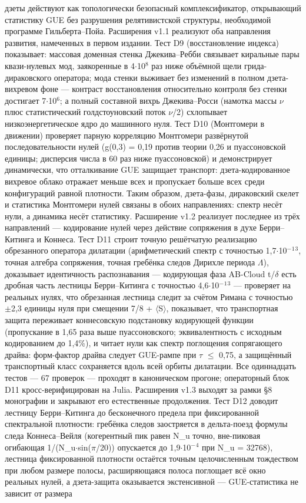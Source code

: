 \documentclass[11pt,a4paper]{article}
\begin{document}
\begin{tcolorbox}[breakable, colback=labblue!6, colframe=labblue!70!black, boxrule=0.6pt, title={Abstract / Аннотация}]
дзеты действуют как топологически безопасный комплексификатор, открывающий статистику GUE без разрушения релятивистской структуры, необходимой программе Гильберта--Пойа. Расширения v1.1 реализуют оба направления развития, намеченных в первом издании. Тест D9 (восстановление индекса) показывает: массовая доменная стенка Джекива--Ребби связывает киральные пары квази-нулевых мод, заякоренные в 4$\cdot$10$^{8}$ раз ниже объёмной щели грида-дираковского оператора; мода стенки выживает без изменений в полном дзета-вихревом фоне --- контраст восстановления относительно контроля без стенки достигает 7$\cdot$10$^{6}$; а полный составной вихрь Джекива--Росси (намотка массы $\nu$ плюс статистический голдстоуновский поток $\nu$/2) схлопывает низкоэнергетическое ядро до машинного нуля. Тест D10 (Монтгомери в движении) проверяет парную корреляцию Монтгомери развёрнутой последовательности нулей (g(0,3) = 0,19 против теории 0,26 и пуассоновской единицы; дисперсия числа в 60 раз ниже пуассоновской) и демонстрирует динамически, что отталкивание GUE защищает транспорт: дзета-кодированное вихревое облако отражает меньше всех и пропускает больше всех среди конфигураций равной плотности. Таким образом, дзета-фазы, дираковский скелет и статистика Монтгомери нулей связаны в обоих направлениях: спектр несёт нули, а динамика несёт статистику. Расширение v1.2 реализует последнее из трёх направлений --- кодирование нулей через действие сопряжения в духе Берри--Китинга и Коннеса. Тест D11 строит точную решётчатую реализацию обрезанного оператора дилатации (арифметический спектр с точностью 1,7$\cdot$10$^{-}$$^{1}$$^{3}$, точная алгебра сопряжения, точная гребёнка следов Дирихле периода $\Lambda$), доказывает идентичность распознавания --- кодирующая фаза AB-Cloud t/$\delta$ есть дробная часть лестницы Берри--Китинга с точностью 4,6$\cdot$10$^{-}$$^{1}$$^{3}$ --- проверяет на реальных нулях, что обрезанная лестница следит за счётом Римана с точностью $\pm$2,3 единицы нуля при смещении 7/8 + $\langle$S$\rangle$, показывает, что транспортная защита переживает коннесовскую подстановку кодирующей функции (пропускание в 1,65 раза выше пуассоновского; эквивалентность с исходным кодированием до 1,4\%), и читает нули как спектр поглощения сопрягающего драйва: форм-фактор драйва следует GUE-рампе при $\tau$ $\le$ 0,75, а защищённый транспортный класс сохраняется вдоль всей орбиты дилатации. Все одиннадцать тестов --- 67 проверок --- проходят в каноническом прогоне; операторный блок D11 кросс-верифицирован на Julia. Расширения v1.3 выходят за рамки \S{}8 монографии и закрывают его естественные продолжения. Тест D12 доводит лестницу Берри--Китинга до бесконечного предела при фиксированной спектральной плотности: гребёнка следов заостряется в дельта-поезд формулы следа Коннеса--Вейля (когерентный пик равен N\_\allowbreak{}u точно, вне-пиковая огибающая 1/(N\_\allowbreak{}u$\cdot$sin($\pi$/20)) опускается до 1,9$\cdot$10$^{-}$$^{4}$ при N\_\allowbreak{}u = 32768), лестница фиксированной плотности остаётся точным целочисленным тождеством при любом размере полосы, расширяющаяся полоса поглощает всё окно реальных нулей, а дзета-защита оказывается экстенсивной --- GUE-статистика не зависит от размера 
\end{tcolorbox}
\end{document}
